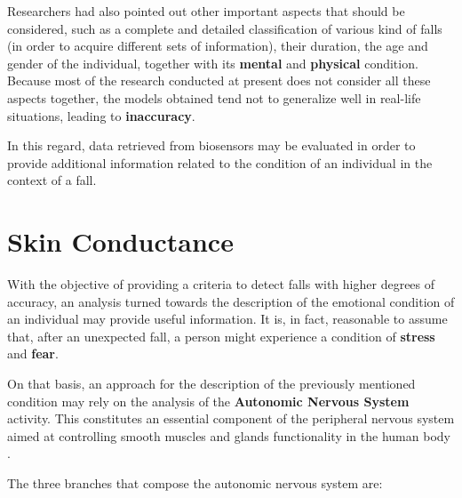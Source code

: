 
Researchers had also pointed out other important aspects that should be considered, such as a complete and detailed classification of various kind of falls (in order to acquire different sets of information), their duration, the age and gender of the individual, together with its \textbf{mental} and \textbf{physical} condition.
Because most of the research conducted at present does not consider all these aspects together, the models obtained tend not to generalize well in real-life situations, leading to \textbf{inaccuracy}.

In this regard, data retrieved from biosensors may be evaluated in order to provide additional information related to the condition of an individual in the context of a fall.

\section{Skin Conductance}\label{sec:edaintro}

With the objective of providing a criteria to detect falls with higher degrees of accuracy, an analysis turned towards the description of the emotional condition of an individual may provide useful information. It is, in fact, reasonable to assume that, after an unexpected fall, a person might experience a condition of \textbf{stress} and \textbf{fear}.

On that basis, an approach for the description of the previously mentioned condition may rely on the analysis of the \textbf{Autonomic Nervous System} activity. This constitutes an essential component of the peripheral nervous system aimed at controlling smooth muscles and glands functionality in the human body \cite{ansWiki}.

The three branches that compose the autonomic nervous system are:

